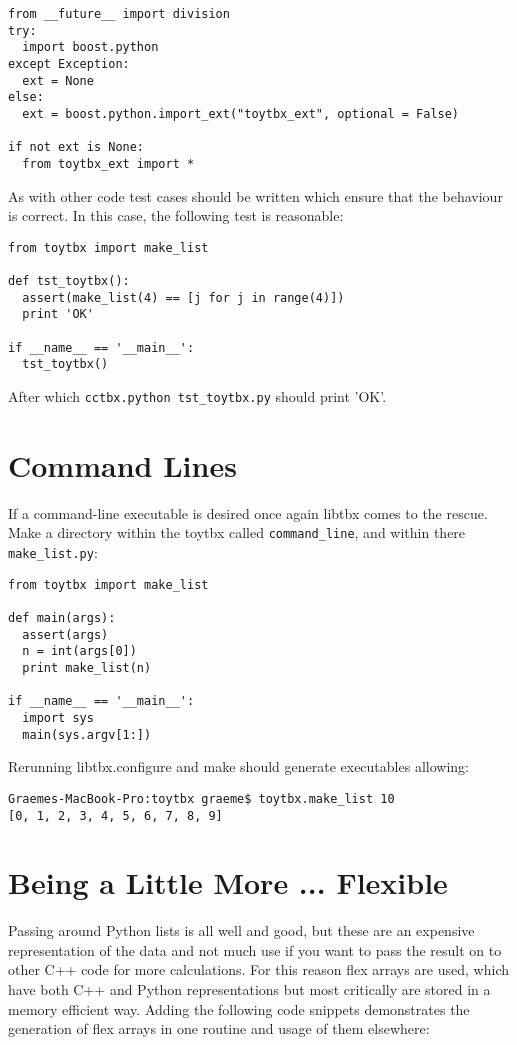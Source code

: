 \documentclass[a4paper, 11pt]{article}
\begin{document}
{\small
\begin{verbatim}
from __future__ import division
try:
  import boost.python
except Exception:
  ext = None
else:
  ext = boost.python.import_ext("toytbx_ext", optional = False)

if not ext is None:
  from toytbx_ext import *
\end{verbatim}
}

As with other code test cases should be written which ensure that the behaviour is correct. In this case, the following test is reasonable:

{\small
\begin{verbatim}
from toytbx import make_list

def tst_toytbx():
  assert(make_list(4) == [j for j in range(4)])
  print 'OK'

if __name__ == '__main__':
  tst_toytbx()
\end{verbatim}
}

After which \verb|cctbx.python tst_toytbx.py| should print 'OK'.

\section{Command Lines}

If a command-line executable is desired once again libtbx comes to the rescue. Make a directory within the toytbx called \verb|command_line|, and within there \verb|make_list.py|:

{\small
\begin{verbatim}
from toytbx import make_list

def main(args):
  assert(args)
  n = int(args[0])
  print make_list(n)

if __name__ == '__main__':
  import sys
  main(sys.argv[1:])
\end{verbatim}
}

Rerunning libtbx.configure and make should generate executables allowing:

{\small
\begin{verbatim}
Graemes-MacBook-Pro:toytbx graeme$ toytbx.make_list 10
[0, 1, 2, 3, 4, 5, 6, 7, 8, 9]
\end{verbatim}
}

\section{Being a Little More ... Flexible}

Passing around Python lists is all well and good, but these are an
expensive representation of the data and not much use if you want to
pass the result on to other C++ code for more calculations. For this
reason flex arrays are used, which have both C++ and Python
representations but most critically are stored in a memory efficient
way. Adding the following code snippets demonstrates the generation of
flex arrays in one routine and usage of them elsewhere:
\end{document}
